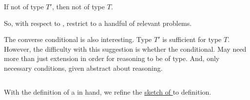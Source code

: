 \begin{note}
  If not of type \(T'\), then not of type \(T\).

  So, with respect to , restrict to a handful of relevant problems.
\end{note}

\begin{note}
  The converse conditional is also interesting.
  Type \(T'\) is sufficient for type \(T\).
  However, the difficulty with this suggestion is whether the conditional.
  May need more than just extension in order for reasoning to be of type.
  And, only necessary conditions, given abstract about reasoning.
\end{note}

\subsection{}
\label{cha:typical:sec:tR:tRDef}

\begin{note}
  With the definition of a \rotor{} in hand, we refine the \hyperref[sketch:tR]{sketch of \tRN{}} to definition.
\end{note}


